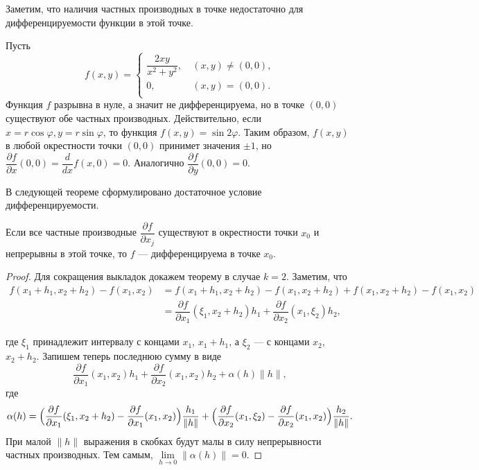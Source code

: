 \documentclass[a4paper]{article}
\theoremstyle{named}
\begin{document}
    Заметим, что наличия частных производных в точке недостаточно для дифференцируемости функции в этой точке.

    \begin{example*}
        Пусть
        $$
            f(x,y)=
            \left\{
            \begin{aligned}
                \dfrac{2xy}{x^2+y^2}, &\ (x,y)\ne(0,0), \\
                0, &\ (x,y)=(0,0).\\
            \end{aligned}
            \right.
        $$
        Функция $f$ разрывна в нуле, а значит не дифференцируема, но в точке $(0,0)$ существуют обе частных производных.
        Действительно, если $x=r\cos\varphi, y=r\sin\varphi$, то функция $f(x,y) = \sin2\varphi$. Таким образом, $f(x,y)$ в любой окрестности точки $(0,0)$ принимет значения $\pm1$, но $\dfrac{\partial f}{\partial x}(0,0) = \dfrac{d}{dx}f(x,0) = 0$.
        Аналогично $\dfrac{\partial f}{\partial y}(0,0)=0$.
    \end{example*}


    В следующей теореме сформулировано достаточное условие дифференцируемости.

    \begin{theorem*}
        Если все частные производные $\dfrac{\partial f}{\partial x_j}$ существуют в окрестности точки $x_0$ и непрерывны в этой точке, то $f$ --- дифференцируема в точке $x_0$.
    \end{theorem*}

    \begin{proof}
        Для сокращения выкладок докажем теорему в случае $k=2$.
        Заметим, что
        \begin{align*}
            f(x_1+h_1,x_2+h_2) - f(x_1,x_2)
            &=f(x_1+h_1,x_2+h_2) - f(x_1,x_2+h_2) + f(x_1, x_2+h_2) - f(x_1,x_2) \\
            &=\dfrac{\partial f}{\partial x_1}(\xi_1, x_2+h_2)h_1 + \dfrac{\partial f}{\partial x_2}(x_1,\xi_2)h_2,
        \end{align*}

        где $\xi_1$ принадлежит интервалу с концами
        $x_1$, $x_1+h_1$, а $\xi_2$ --- с концами $x_2$, $x_2+h_2$.
        Запишем теперь последнюю сумму в виде
        $$
            \dfrac{\partial f}{\partial x_1}(x_1, x_2)h_1 + \dfrac{\partial f}{\partial x_2}(x_1,x_2)h_2 + \alpha(h)\|h\|,
        $$
        где
        $$
            \alpha(h) =
            \Bigl(\dfrac{\partial f}{\partial x_1}(\xi_1, x_2+h_2) - \dfrac{\partial f}{\partial x_1}(x_1, x_2)\Bigr)\dfrac{h_1}{\|h\|}
            +
            \Bigl(\dfrac{\partial f}{\partial x_2}(x_1,\xi_2) - \dfrac{\partial f}{\partial x_2}(x_1, x_2)\Bigr)\dfrac{h_2}{\|h\|}.
        $$
        При малой $\|h\|$ выражения в скобках будут малы в силу непрерывности частных производных.
        Тем самым, $\lim\limits_{h\to 0}\|\alpha(h)\| = 0$.
    \end{proof}
\end{document}
